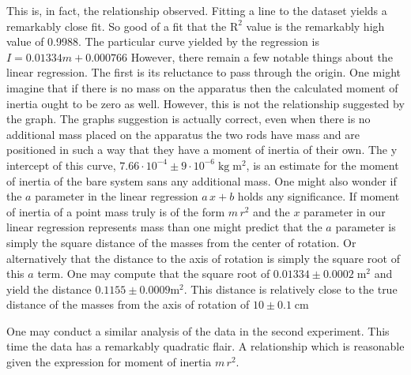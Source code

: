\documentclass[11pt]{article}
\begin{document}
This is, in fact, the relationship observed. Fitting a line to the dataset yields a remarkably close fit. So good of a fit that the \( \mathrm{R}^2 \) value is the remarkably high value of 0.9988. The particular curve yielded by the regression is \(I = 0.01334m + 0.000766\) However, there remain a few notable things about the linear regression. The first is its reluctance to pass through the origin. One might imagine that if there is no mass on the apparatus then the calculated moment of inertia ought to be zero as well. However, this is not the relationship suggested by the graph. The graphs suggestion is actually correct, even when there is no additional mass placed on the apparatus the two rods have mass and are positioned in such a way that they have a moment of inertia of their own. The y intercept of this curve,  \(7.66 \cdot 10^{-4} \pm 9 \cdot 10 ^{-6}  \; \mathrm{kg} \; \mathrm{m}^2 \), is an estimate for the moment of inertia of the bare system sans any additional mass. One might also wonder if the \(a\) parameter in the linear regression \(a\,x + b \) holds any significance. If moment of inertia of a point mass truly is of the form \(m \, r^2\) and the \(x\) parameter in our linear regression represents mass than one might predict that the \(a\) parameter is simply the square distance of the masses from the center of rotation. Or alternatively that the distance to the axis of rotation is simply the square root of this \(a\) term. One may compute that the square root of \(0.01334 \pm 0.0002 \; \mathrm{m}^2\) and yield the distance \(0.1155 \pm 0.0009 \mathrm{m}^2 \). This distance is relatively close to the true distance of the masses from the axis of rotation of \(10 \pm 0.1 \; \mathrm{cm}\)

One may conduct a similar analysis of the data in the second experiment. This time the data has a remarkably quadratic flair. A relationship which is reasonable given the expression for moment of inertia \(m \, r^2\).
\end{document}
